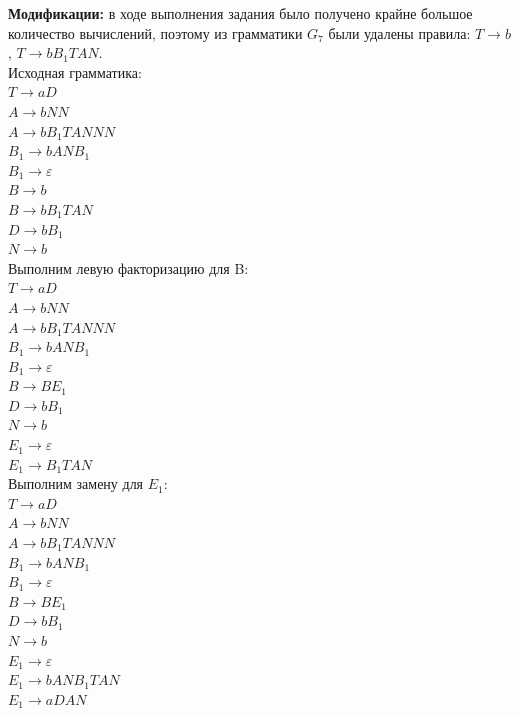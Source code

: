 \documentclass[a4paper,14pt]{extarticle}
\begin{document}
\begin{enumerate}[1.]
\textbf{Модификации: }в ходе выполнения задания было получено крайне большое количество вычислений, поэтому
из грамматики $G_7$ были удалены правила: $T \rightarrow b$, $T \rightarrow bB_1TAN$.\\

Исходная грамматика:\\
$T \rightarrow aD$\\
$A \rightarrow bNN$\\
$A \rightarrow bB_1TANNN$\\
$B_1 \rightarrow bANB_1$\\
$B_1 \rightarrow \varepsilon$\\
$B \rightarrow b$\\
$B \rightarrow bB_1TAN$\\
$D \rightarrow bB_1$\\
$N \rightarrow b$\\

Выполним левую факторизацию для B:\\
$T \rightarrow aD$\\
$A \rightarrow bNN$\\
$A \rightarrow bB_1TANNN$\\
$B_1 \rightarrow bANB_1$\\
$B_1 \rightarrow \varepsilon$\\
$B \rightarrow BE_1$\\
$D \rightarrow bB_1$\\
$N \rightarrow b$\\
$E_1 \rightarrow \varepsilon$\\
$E_1 \rightarrow B_1TAN$\\

Выполним замену для $E_1$:\\
$T \rightarrow aD$\\
$A \rightarrow bNN$\\
$A \rightarrow bB_1TANNN$\\
$B_1 \rightarrow bANB_1$\\
$B_1 \rightarrow \varepsilon$\\
$B \rightarrow BE_1$\\
$D \rightarrow bB_1$\\
$N \rightarrow b$\\
$E_1 \rightarrow \varepsilon$\\
$E_1 \rightarrow bANB_1TAN$\\
$E_1 \rightarrow aDAN$\\


\end{enumerate}
\end{document}
